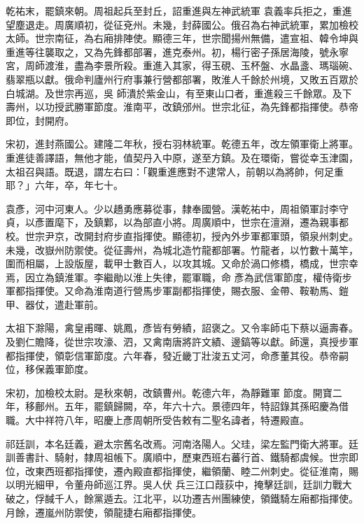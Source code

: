 \begin{pinyinscope}
 乾祐末，罷鎮來朝。周祖起兵至封丘，詔重進與左神武統軍
 袁義率兵拒之，重進望塵退走。周廣順初，從征兗州。未幾，封薛國公。俄召為右神武統軍，累加檢校太師。世宗南征，為右廂排陣使。顯德三年，世宗聞揚州無備，遣宣祖、韓令坤與重進等往襲取之，又為先鋒都部署，進克泰州。初，楊行密子孫居海陵，號永寧宮，周師渡淮，盡為李景所殺。重進入其家，得玉硯、玉杯盤、水晶盞、瑪瑙碗、翡翠瓶以獻。俄命判廬州行府事兼行營都部署，敗淮人千餘於州境，又敗五百眾於白城湖。及世宗再巡，吳
 師潰於紫金山，有至東山口者，重進殺三千餘眾。及下壽州，以功授武勝軍節度。淮南平，改鎮邠州。世宗北征，為先鋒都指揮使。恭帝即位，封開府。



 宋初，進封燕國公。建隆二年秋，授右羽林統軍。乾德五年，改左領軍衛上將軍。重進徒善譯語，無他才能，值契丹入中原，遂至方鎮。及在環衛，嘗從幸玉津園，太祖召與語。既退，謂左右曰：「觀重進應對不逮常人，前朝以為將帥，何足重耶？」六年，卒，年七十。



 袁彥，河中河東人。少以趫勇應募從事，隸奉國營。漢乾祐中，周祖領軍討李守貞，以彥置麾下，及鎮鄴，以為部直小將。周廣順中，世宗在澶淵，遷為親事都校。世宗尹京，改開封府步直指揮使。顯德初，授內外步軍都軍頭，領泉州刺史。未幾，改嶽州防禦使。從征壽州，為城北造竹龍都部署。竹龍者，以竹數十萬竿，圍而相屬，上設版屋，載甲士數百人，以攻其城。又命於渦口修橋，橋成，世宗幸焉，因立為鎮淮軍。李繼勛以淮上失律，罷軍職，命
 彥為武信軍節度，權侍衛步軍都指揮使。又命為淮南道行營馬步軍副都指揮使，賜衣服、金帶、鞍勒馬、鎧甲、器仗，遣赴軍前。



 太祖下滁陽，禽皇甫暉、姚鳳，彥皆有勞績，詔褒之。又令率師屯下蔡以逼壽春。及劉仁贍降，從世宗攻濠、泗，又禽南唐將許文績、邊鎬等以獻。師還，真授步軍都指揮使，領彰信軍節度。六年春，發近畿丁壯浚五丈河，命彥董其役。恭帝嗣位，移保義軍節度。



 宋初，加檢校太尉。是秋來朝，改鎮曹州。乾德六年，為靜難軍
 節度。開寶二年，移鄜州。五年，罷鎮歸闕，卒，年六十六。景德四年，特詔錄其孫昭慶為借職。大中祥符八年，昭慶上彥周朝所受告敕有二聖名諱者，特遷殿直。



 祁廷訓，本名廷義，避太宗舊名改焉。河南洛陽人。父珪，梁左監門衛大將軍。廷訓善書計、騎射，隸周祖帳下。廣順中，歷東西班右蕃行首、鐵騎都虞候。世宗即位，改東西班都指揮使，遷內殿直都指揮使，繼領蘭、睦二州刺史。從征淮南，賜以明光細甲，令董舟師巡江界。吳人伏
 兵三江口葭荻中，掩擊廷訓，廷訓力戰大破之，俘馘千人，餘黨遁去。江北平，以功遷吉州團練使，領鐵騎左廂都指揮使。月餘，遷嵐州防禦使，領龍捷右廂都指揮使。




\end{pinyinscope}
